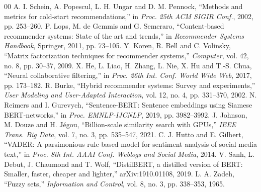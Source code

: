 \documentclass[conference]{IEEEtran}
\begin{document}
\begin{thebibliography}{00}
 A. I. Schein, A. Popescul, L. H. Ungar and D. M. Pennock, ``Methods and metrics for cold-start recommendations,'' in \textit{Proc. 25th ACM SIGIR Conf.}, 2002, pp. 253--260.
 P. Lops, M. de Gemmis and G. Semeraro, ``Content-based recommender systems: State of the art and trends,'' in \textit{Recommender Systems Handbook}, Springer, 2011, pp. 73--105.
 Y. Koren, R. Bell and C. Volinsky, ``Matrix factorization techniques for recommender systems,'' \textit{Computer}, vol. 42, no. 8, pp. 30--37, 2009.
 X. He, L. Liao, H. Zhang, L. Nie, X. Hu and T.-S. Chua, ``Neural collaborative filtering,'' in \textit{Proc. 26th Int. Conf. World Wide Web}, 2017, pp. 173--182.
 R. Burke, ``Hybrid recommender systems: Survey and experiments,'' \textit{User Modeling and User-Adapted Interaction}, vol. 12, no. 4, pp. 331--370, 2002.
 N. Reimers and I. Gurevych, ``Sentence-BERT: Sentence embeddings using Siamese BERT-networks,'' in \textit{Proc. EMNLP-IJCNLP}, 2019, pp. 3982--3992.
 J. Johnson, M. Douze and H. J\'egou, ``Billion-scale similarity search with GPUs,'' \textit{IEEE Trans. Big Data}, vol. 7, no. 3, pp. 535--547, 2021.
 C. J. Hutto and E. Gilbert, ``VADER: A parsimonious rule-based model for sentiment analysis of social media text,'' in \textit{Proc. 8th Int. AAAI Conf. Weblogs and Social Media}, 2014.
 V. Sanh, L. Debut, J. Chaumond and T. Wolf, ``DistilBERT, a distilled version of BERT: Smaller, faster, cheaper and lighter,'' arXiv:1910.01108, 2019.
 L. A. Zadeh, ``Fuzzy sets,'' \textit{Information and Control}, vol. 8, no. 3, pp. 338--353, 1965.
\end{thebibliography}
\end{document}

